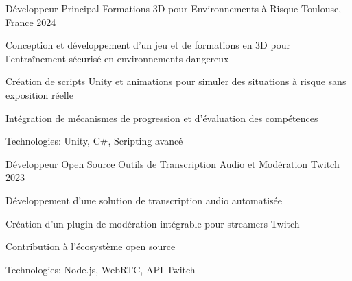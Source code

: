 


\begin{cventries}


\cventry
{Développeur Principal} %
{Formations 3D pour Environnements à Risque} %
{Toulouse, France} %
{2024} %
{ %
\begin{cvitems}
\item {Conception et développement d'un jeu et de formations en 3D pour l'entraînement sécurisé en environnements dangereux}
\item {Création de scripts Unity et animations pour simuler des situations à risque sans exposition réelle}
\item {Intégration de mécanismes de progression et d'évaluation des compétences}
\item {Technologies: Unity, C\#, Scripting avancé}
\end{cvitems}
}
\vspace{1.5em}


\cventry
{Développeur Open Source} %
{Outils de Transcription Audio et Modération Twitch} %
{} %
{2023} %
{ %
\begin{cvitems}
\item {Développement d'une solution de transcription audio automatisée}
\item {Création d'un plugin de modération intégrable pour streamers Twitch}
\item {Contribution à l'écosystème open source}
\item {Technologies: Node.js, WebRTC, API Twitch}
\end{cvitems}
}
\vspace{1.5em}



\end{cventries}
